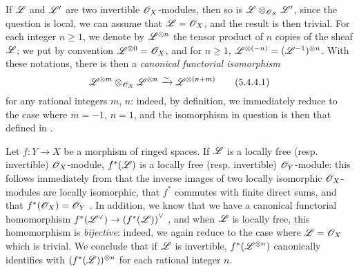 \begin{env}[5.4.4]
\label{0.5.4.4}
If $\mathscr{L}$ and $\mathscr{L}'$ are two invertible $\mathscr{O}_X$-modules, then so is
$\mathscr{L}\otimes_{\mathscr{O}_X}\mathscr{L}'$, since the question is local, we can assume that
$\mathscr{L}=\mathscr{O}_X$, and the result is then trivial. For each integer $n\geqslant 1$,
we denote by $\mathscr{L}^{\otimes n}$ the tensor product of $n$ copies of the sheaf
$\mathscr{L}$; we put by convention $\mathscr{L}^{\otimes 0}=\mathscr{O}_X$, and for
$n\geqslant 1$, $\mathscr{L}^{\otimes(-n)}=(\mathscr{L}^{-1})^{\otimes n}$. With these
notations, there is then a {\em canonical functorial isomorphism}
\[
  \mathscr{L}^{\otimes m}\otimes_{\mathscr{O}_X}\mathscr{L}^{\otimes n}\xrightarrow{\sim}\mathscr{L}^{\otimes(n+m)}
  \tag{5.4.4.1}
\]
for any rational integers $m$, $n$: indeed, by definition, we immediately reduce
to the case where $m=-1$, $n=1$, and the isomorphism in question is then that
defined in .
\end{env}

\begin{env}[5.4.5]
\label{0.5.4.5}
Let $f:Y\to X$ be a morphism of ringed spaces. If $\mathscr{L}$ is a locally free
(resp. invertible) $\mathscr{O}_X$-module, $f^*(\mathscr{L})$ is a locally free
(resp. invertible) $\mathscr{O}_Y$-module: this follows immediately from that the
inverse images of two locally isomorphic $\mathscr{O}_X$-modules are locally isomorphic,
that $f^*$ commutes with finite direct sums, and that $f^*(\mathscr{O}_X)=\mathscr{O}_Y$
. In addition, we know that we have a canonical functorial
homomorphism $f^*({\mathscr{L}}^\vee)\to{(f^*(\mathscr{L}))}^\vee$ , and
when $\mathscr{L}$ is locally free, this homomorphism is {\em bijective}: indeed, we
again reduce to the case where $\mathscr{L}=\mathscr{O}_X$ which is trivial. We conclude that
if $\mathscr{L}$ is invertible, $f^*(\mathscr{L}^{\otimes n})$ canonically identifies with
$(f^*(\mathscr{L}))^{\otimes n}$ for each rational integer $n$.
\end{env}

